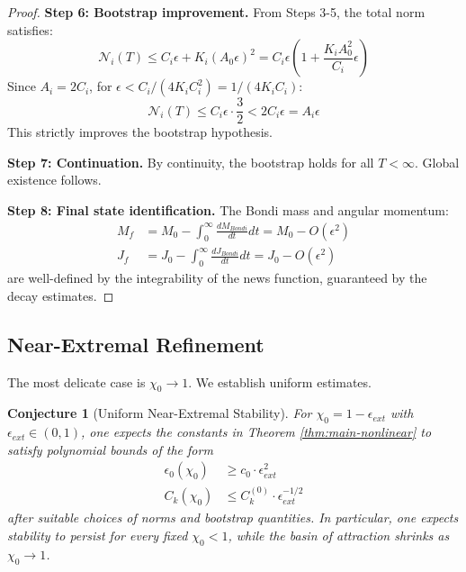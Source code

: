 \documentclass[12pt,a4paper]{article}
\newtheorem{conjecture}[theorem]{Conjecture}
\begin{document}
\begin{proof}
\textbf{Step 6: Bootstrap improvement.}
From Steps 3-5, the total norm satisfies:
\begin{equation}
\mathcal{N}_i(T) \leq C_i \epsilon + K_i (A_0 \epsilon)^2 = C_i \epsilon \left(1 + \frac{K_i A_0^2}{C_i} \epsilon\right)
\end{equation}
Since $A_i = 2C_i$, for $\epsilon < C_i/(4K_i C_i^2) = 1/(4K_i C_i)$:
\begin{equation}
\mathcal{N}_i(T) \leq C_i \epsilon \cdot \frac{3}{2} < 2C_i \epsilon = A_i \epsilon
\end{equation}
This strictly improves the bootstrap hypothesis.

\textbf{Step 7: Continuation.}
By continuity, the bootstrap holds for all $T < \infty$. Global existence follows.

\textbf{Step 8: Final state identification.}
The Bondi mass and angular momentum:
\begin{align}
M_f &= M_0 - \int_0^\infty \frac{dM_{Bondi}}{dt} dt = M_0 - O(\epsilon^2) \\
J_f &= J_0 - \int_0^\infty \frac{dJ_{Bondi}}{dt} dt = J_0 - O(\epsilon^2)
\end{align}
are well-defined by the integrability of the news function, guaranteed by the decay estimates.
\end{proof}

\subsection{Near-Extremal Refinement}

The most delicate case is $\chi_0 \to 1$. We establish uniform estimates.

\begin{conjecture}[Uniform Near-Extremal Stability]\label{thm:near-extremal-uniform}
For $\chi_0 = 1 - \epsilon_{ext}$ with $\epsilon_{ext} \in (0, 1)$, one expects the constants in Theorem \ref{thm:main-nonlinear} to satisfy polynomial bounds of the form
\begin{align}
\epsilon_0(\chi_0) &\geq c_0 \cdot \epsilon_{ext}^{2} \\
C_k(\chi_0) &\leq C_k^{(0)} \cdot \epsilon_{ext}^{-1/2}
\end{align}
after suitable choices of norms and bootstrap quantities. In particular, one expects stability to persist for every fixed $\chi_0<1$, while the basin of attraction shrinks as $\chi_0 \to 1$.
\end{conjecture}
\end{document}
